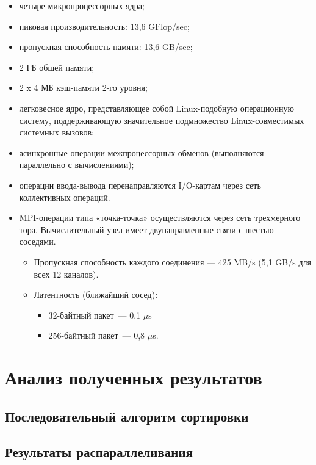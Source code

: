 \documentclass[oneside,final,14pt]{extreport}
\begin{document}
\begin{itemize}
    \item четыре микропроцессорных ядра;
    \item пиковая производительность: 13,6 GFlop/sec;
    \item пропускная способность памяти: 13,6 GB/sec;
    \item 2 ГБ общей памяти;
    \item 2 x 4 МБ кэш-памяти 2-го уровня;
    \item легковесное ядро, представляющее собой Linux-подобную операционную систему,
        поддерживающую значительное подмножество Linux-совместимых системных вызовов;
    \item асинхронные операции межпроцессорных обменов (выполняются параллельно с вычислениями);
    \item операции ввода-вывода перенаправляются I/O-картам через сеть коллективных операций.
    \item MPI-операции типа «точка-точка» осуществляются через сеть трехмерного тора.
        Вычислительный узел имеет двунаправленные связи с шестью соседями.
        \begin{itemize}
            \item Пропускная способность каждого соединения — 425 MB/s (5,1 GB/s для всех 12
        каналов).
            \item Латентность (ближайший сосед):
                \begin{itemize}
                    \item 32-байтный пакет~--- 0,1 $\mu$s
                    \item 256-байтный пакет~--- 0,8 $\mu$s.
                \end{itemize}
        \end{itemize}
\end{itemize}


\chapter*{Анализ полученных результатов}

\section*{Последовательный алгоритм сортировки}
\section*{Результаты распараллеливания}
\end{document}
